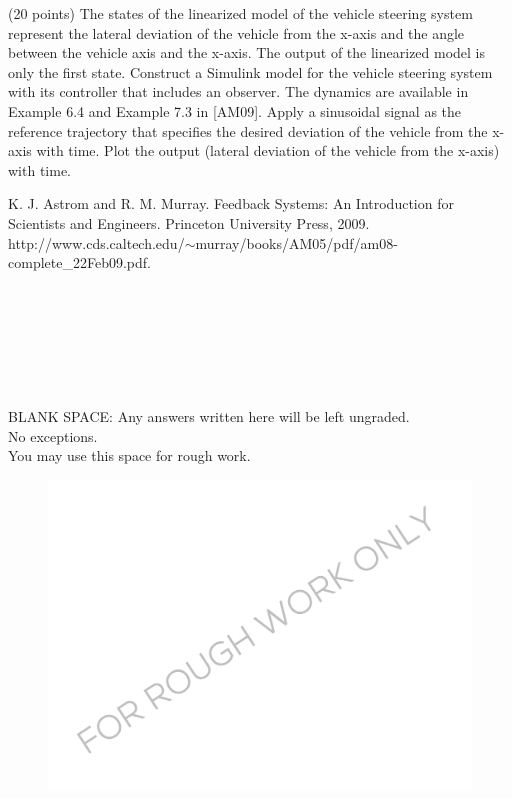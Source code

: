 \documentclass[a4paper, 12pt]{article}
\begin{document}
\begin{problem}{}
(20 points) The states of the linearized model of the vehicle steering system represent the lateral deviation of the vehicle from the x-axis and the angle between the vehicle axis and the x-axis. The output of the linearized model is only the first state. Construct a Simulink model for the vehicle steering system with its controller that includes an observer. The dynamics are available in Example 6.4 and Example 7.3 in [AM09]. Apply a sinusoidal signal as the reference trajectory that specifies the desired deviation of the vehicle from the x-axis with time. Plot the output (lateral deviation of the vehicle from the x-axis) with time. 

\noindent
\noindent
[AM09] K. J. Astrom and R. M. Murray. Feedback Systems: An Introduction for Scientists and Engineers. Princeton University Press, 2009. \\
http://www.cds.caltech.edu/$\sim$murray/books/AM05/pdf/am08-complete\_22Feb09.pdf. \\
\\
\begin{minipage}{1\textwidth}
		\rectangle{\linewidth}{20cm}
\end{minipage}
\newpage
\ \\
\begin{minipage}{1\textwidth}
		\rectangle{\linewidth}{24cm}
\end{minipage}
\newpage
\ \\
\begin{minipage}{1\textwidth}
		\rectangle{\linewidth}{24cm}
\end{minipage}
\newpage
\ \\
\begin{minipage}{1\textwidth}
		\rectangle{\linewidth}{24cm}
\end{minipage}
\end{problem}

\newpage

\begin{center}
	BLANK SPACE: Any answers written here will be left ungraded.\\ No exceptions.\\ You may use this space for rough work.
\end{center}
\begin{figure}[h!]
\includegraphics[width=\columnwidth]{watermark.png}%
\end{figure}
\end{document}
